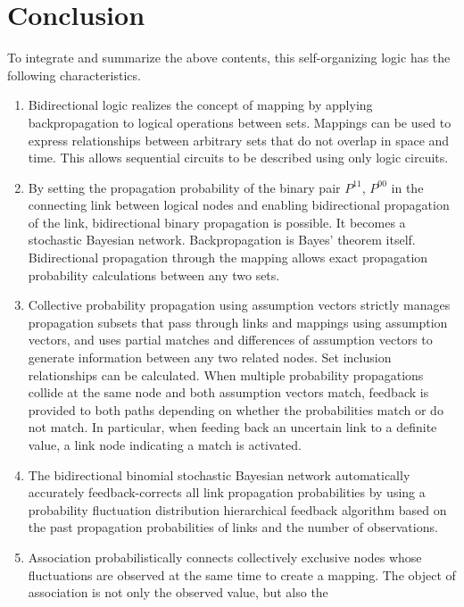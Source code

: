 \documentclass[12pt]{article}
\begin{document}
\section{Conclusion}\label{conclusion}

To integrate and summarize the above contents, this self-organizing
logic has the following characteristics.

\begin{enumerate}
\def\labelenumi{\arabic{enumi}.}
\item
  Bidirectional logic realizes the concept of mapping by applying
  backpropagation to logical operations between sets. Mappings can be
  used to express relationships between arbitrary sets that do not
  overlap in space and time. This allows sequential circuits to be
  described using only logic circuits.
\item
  By setting the propagation probability of the binary pair \(P^{11}\),
  \(P^{00}\) in the connecting link between logical nodes and enabling
  bidirectional propagation of the link, bidirectional binary
  propagation is possible. It becomes a stochastic Bayesian network.
  Backpropagation is Bayes' theorem itself. Bidirectional propagation
  through the mapping allows exact propagation probability calculations
  between any two sets.
\item
  Collective probability propagation using assumption vectors strictly
  manages propagation subsets that pass through links and mappings using
  assumption vectors, and uses partial matches and differences of
  assumption vectors to generate information between any two related
  nodes. Set inclusion relationships can be calculated. When multiple
  probability propagations collide at the same node and both assumption
  vectors match, feedback is provided to both paths depending on whether
  the probabilities match or do not match. In particular, when feeding
  back an uncertain link to a definite value, a link node indicating a
  match is activated.
\item
  The bidirectional binomial stochastic Bayesian network automatically
  accurately feedback-corrects all link propagation probabilities by
  using a probability fluctuation distribution hierarchical feedback
  algorithm based on the past propagation probabilities of links and the
  number of observations.
\item
  Association probabilistically connects collectively exclusive nodes
  whose fluctuations are observed at the same time to create a mapping.
  The object of association is not only the observed value, but also the

\end{enumerate}
\end{document}
